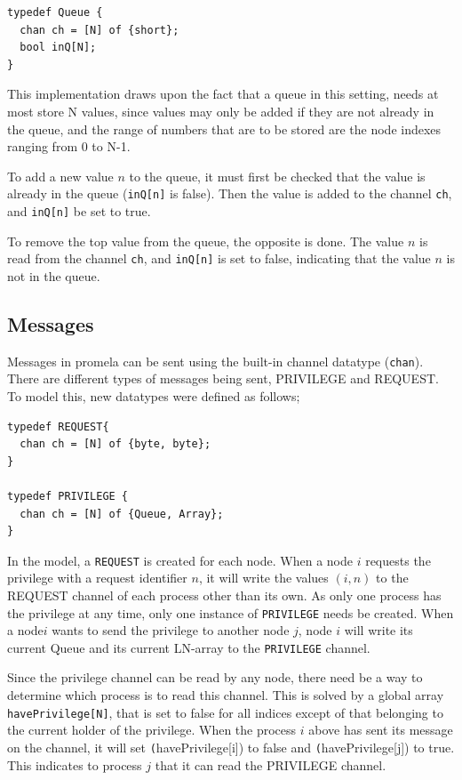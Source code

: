 \documentclass[a4paper,12pt]{article}
\begin{document}
\begin{lstlisting}
typedef Queue {
  chan ch = [N] of {short};
  bool inQ[N];
}
\end{lstlisting}

This implementation draws upon the fact that a queue in this setting, needs at most store N values, since values may only be added if they are not already in the queue, and the range of numbers that are to be stored are the node indexes ranging from 0 to N-1.

To add a new value $n$ to the queue, it must first be checked that the value is already in the queue (\texttt{inQ[n]} is false). Then the value is added to the channel \texttt{ch}, and \texttt{inQ[n]} be set to true.

To remove the top value from the queue, the opposite is done. The value $n$ is read from the channel \texttt{ch}, and \texttt{inQ[n]} is set to false, indicating that the value $n$ is not in the queue.

\subsection{Messages}
Messages in promela can be sent using the built-in channel datatype (\texttt{chan}). There are different types of messages being sent, PRIVILEGE and REQUEST. To model this, new datatypes were defined as follows;

\begin{lstlisting}
typedef REQUEST{
  chan ch = [N] of {byte, byte};
}

typedef PRIVILEGE {
  chan ch = [N] of {Queue, Array};
}

\end{lstlisting}


In the model, a \texttt{REQUEST} is created for each node. When a node $i$ requests the privilege with a request identifier $n$, it will write the values $(i,n)$ to the REQUEST channel of each process other than its own. As only one process has the privilege at any time, only one instance of \texttt{PRIVILEGE} needs be created. When a node$i$ wants to send the privilege to another node $j$, node $i$ will write its current Queue and its current LN-array to the \texttt{PRIVILEGE} channel.

Since the privilege channel can be read by any node, there need be a way to determine which process is to read this channel. This is solved by a global array \texttt{havePrivilege[N]}, that is set to false for all indices except of that belonging to the current holder of the privilege. When the process $i$ above has sent its message on the channel, it will set \texttt (havePrivilege[i]) to false and \texttt (havePrivilege[j]) to true. This indicates to process $j$ that it can read the PRIVILEGE channel.
\end{document}
